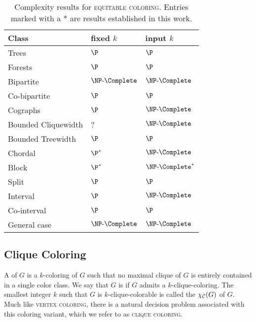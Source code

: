 \begin{table}[!htb]
    \centering
    \begin{tabular}{l|l|l}
       \hline
       \hline
       Class               &  fixed $k$         & input $k$             \\
       \hline
       Trees                &  $\P$             & $\P$                  \\
       Forests              &  $\P$             & $\P$                  \\
       Bipartite            &  $\NPc$           & $\NPc$                \\
       Co-bipartite         &  $\P$             & $\P$                  \\
       Cographs             &  $\P$             & $\NPc$                \\
       Bounded Cliquewidth  &  ?                & $\NPc$                \\
       Bounded Treewidth    &  $\P$             & $\P$                  \\
       Chordal              &  $\P^*$           & $\NPc$                \\
       Block                &  $\P^*$           & $\NPc^*$              \\
       Split                &  $\P$             & $\P$                  \\
       Interval             &  $\P$             & $\NPc$                \\
       Co-interval          &  $\P$             & $\P$                  \\
       General case         &  $\NPc$           & $\NPc$                \\
       \hline
       \hline
    \end{tabular}
    \caption{Complexity results for \textsc{equitable coloring}. Entries marked with a * are results established in this work.}
    \label{tab:equitable_complexity}
\end{table}

\subsection{Clique Coloring}
A  of $G$ is a $k$-coloring of $G$ such that no maximal clique of $G$ is entirely contained in a single color class.
We say that $G$ is  if $G$ admits a $k$-clique-coloring.
The smallest integer $k$ such that $G$ is $k$-clique-colorable is called the  $\chi_{\mathcal{C}}(G)$ of $G$.
Much like \textsc{vertex coloring}, there is a natural decision problem associated with this coloring variant, which we refer to as \textsc{clique coloring}.


